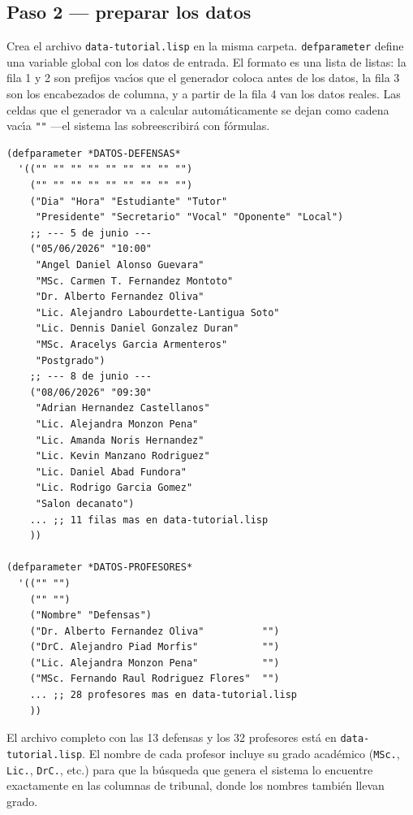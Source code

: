 \documentclass[12pt,a4paper]{report}
\begin{document}
\subsection{Paso 2 --- preparar los datos}

Crea el archivo \texttt{data-tutorial.lisp} en la misma carpeta.
\texttt{defparameter} define una variable global con los datos de entrada.
El formato es una lista de listas: la fila 1 y 2 son prefijos vac\'{\i}os
que el generador coloca antes de los datos, la fila 3 son los encabezados
de columna, y a partir de la fila 4 van los datos reales.
Las celdas que el generador va a calcular autom\'aticamente se dejan como
cadena vac\'{\i}a \texttt{""} ---el sistema las sobreescribir\'a con f\'ormulas.

\begin{lstlisting}[caption={data-tutorial.lisp (extracto).}]
(defparameter *DATOS-DEFENSAS*
  '(("" "" "" "" "" "" "" "" "")
    ("" "" "" "" "" "" "" "" "")
    ("Dia" "Hora" "Estudiante" "Tutor"
     "Presidente" "Secretario" "Vocal" "Oponente" "Local")
    ;; --- 5 de junio ---
    ("05/06/2026" "10:00"
     "Angel Daniel Alonso Guevara"
     "MSc. Carmen T. Fernandez Montoto"
     "Dr. Alberto Fernandez Oliva"
     "Lic. Alejandro Labourdette-Lantigua Soto"
     "Lic. Dennis Daniel Gonzalez Duran"
     "MSc. Aracelys Garcia Armenteros"
     "Postgrado")
    ;; --- 8 de junio ---
    ("08/06/2026" "09:30"
     "Adrian Hernandez Castellanos"
     "Lic. Alejandra Monzon Pena"
     "Lic. Amanda Noris Hernandez"
     "Lic. Kevin Manzano Rodriguez"
     "Lic. Daniel Abad Fundora"
     "Lic. Rodrigo Garcia Gomez"
     "Salon decanato")
    ... ;; 11 filas mas en data-tutorial.lisp
    ))

(defparameter *DATOS-PROFESORES*
  '(("" "")
    ("" "")
    ("Nombre" "Defensas")
    ("Dr. Alberto Fernandez Oliva"          "")
    ("DrC. Alejandro Piad Morfis"           "")
    ("Lic. Alejandra Monzon Pena"           "")
    ("MSc. Fernando Raul Rodriguez Flores"  "")
    ... ;; 28 profesores mas en data-tutorial.lisp
    ))
\end{lstlisting}

El archivo completo con las 13 defensas y los 32 profesores est\'a en
\texttt{data-tutorial.lisp}.
El nombre de cada profesor incluye su grado acad\'emico
(\texttt{MSc.}, \texttt{Lic.}, \texttt{DrC.}, etc.) para que la
b\'usqueda que genera el sistema lo encuentre exactamente en las columnas
de tribunal, donde los nombres tambi\'en llevan grado.
\end{document}
